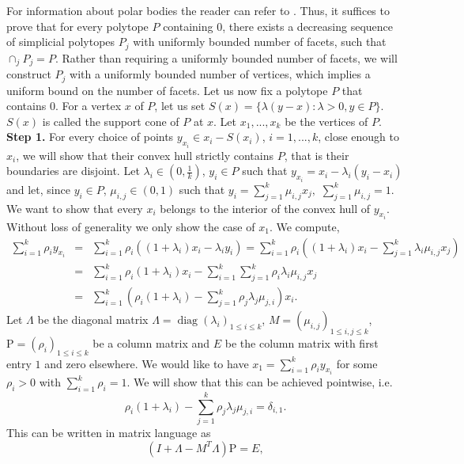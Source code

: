 \documentclass[footinclude=true]{amsart}
\theoremstyle{plain}
\DeclareMathOperator{\diag}{diag}
\begin{document}
    For information about polar bodies the reader can refer to \cite[Chapter 14]{MR2335496}. Thus, it suffices to prove that for every polytope $P$ containing $0$, there exists a decreasing sequence of simplicial polytopes $P_j$ with uniformly bounded number of facets, such that $\cap_j P_j = P$. Rather than requiring a uniformly bounded number of facets, we will construct $P_j$ with a uniformly bounded number of vertices, which implies a uniform bound on the number of facets. Let us now fix a polytope $P$ that contains $0$. For a vertex $x$ of $P$, let us set $S(x)=\{\lambda(y-x):\lambda>0,y\in P\}$. $S(x)$ is called the support cone of $P$ at $x$. Let $x_1,...,x_k$ be the vertices of $P$. 
    \\ \textbf{Step 1.}
     For every choice of points $y_{x_i}\in x_i-S(x_i)$, $i=1,...,k$, close enough to $x_i$, we will show that their convex hull strictly contains $P$, that is their boundaries are disjoint. Let $\lambda_i\in (0,\frac{1}{k})$, $y_i\in P$ such that $y_{x_i}=x_i-\lambda_i(y_i-x_i)$ and let, since $y_i\in P$, $\mu_{i,j}\in (0,1)$ such that $y_i=\sum_{j=1}^k\mu_{i,j}x_j,$ $\sum_{j=1}^k\mu_{i,j}=1$. We want to show that every $x_i$ belongs to the interior of the convex hull of $y_{x_i}$. Without loss of generality we only show the case of $x_1$. We compute,
    \begin{eqnarray}
    	\sum_{i=1}^{k}\rho_i y_{x_i}&=&\sum_{i=1}^{k}\rho_i ((1+\lambda_i)x_i-\lambda_i y_i)=\sum_{i=1}^{k}\rho_i ((1+\lambda_i)x_i- \sum_{j=1}^k\lambda_i\mu_{i,j}x_j) \nonumber \\
    	&=& \sum_{i=1}^{k}\rho_i (1+\lambda_i)x_i - \sum_{i=1}^k\sum_{j=1}^k\rho_i\lambda_i\mu_{i,j}x_j \nonumber \\ &=& \sum_{i=1}^{k}\left(\rho_i (1+\lambda_i)-\sum_{j=1}^k\rho_j\lambda_j\mu_{j,i} \right)x_i. \nonumber 
    \end{eqnarray}
Let $\Lambda$ be the diagonal matrix $\Lambda=\diag(\lambda_i)_{1\leq i\leq k}$, $M=(\mu_{i,j})_{1\leq i,j\leq k}$, $\mathrm{P}=(\rho_i)_{1\leq i\leq k}$ be a column matrix and $E$ be the column matrix with first entry $1$ and zero elsewhere. We would like to have $x_1=\sum_{i=1}^{k}\rho_i y_{x_i}$ for some $\rho_i > 0$ with $\sum_{i=1}^{k}\rho_i =1$.
We will show that this can be achieved pointwise, i.e.
\begin{equation}\label{matrix} \rho_i (1+\lambda_i)-\sum_{j=1}^k\rho_j\lambda_j\mu_{j,i}=\delta_{i,1}.
\end{equation}
 This can be written in matrix language as
$$(I+\Lambda-M^{T}\Lambda)\mathrm{P}=E,$$ 
\end{document}
